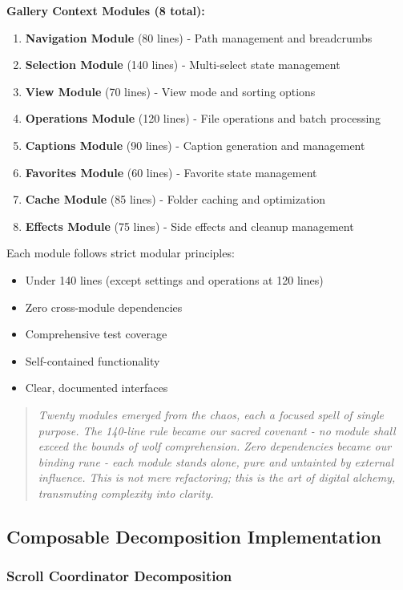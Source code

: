 \documentclass[11pt]{article}
\begin{document}
\textbf{Gallery Context Modules (8 total):}
\begin{enumerate}
\item \textbf{Navigation Module} (80 lines) - Path management and breadcrumbs
\item \textbf{Selection Module} (140 lines) - Multi-select state management
\item \textbf{View Module} (70 lines) - View mode and sorting options
\item \textbf{Operations Module} (120 lines) - File operations and batch processing
\item \textbf{Captions Module} (90 lines) - Caption generation and management
\item \textbf{Favorites Module} (60 lines) - Favorite state management
\item \textbf{Cache Module} (85 lines) - Folder caching and optimization
\item \textbf{Effects Module} (75 lines) - Side effects and cleanup management
\end{enumerate}

Each module follows strict modular principles:
\begin{itemize}
\item Under 140 lines (except settings and operations at 120 lines)
\item Zero cross-module dependencies
\item Comprehensive test coverage
\item Self-contained functionality
\item Clear, documented interfaces
\end{itemize}

\begin{quote}
\emph{Twenty modules emerged from the chaos, each a focused spell of single purpose. The 140-line rule became our sacred covenant - no module shall exceed the bounds of wolf comprehension. Zero dependencies became our binding rune - each module stands alone, pure and untainted by external influence. This is not mere refactoring; this is the art of digital alchemy, transmuting complexity into clarity.}
\end{quote}

\subsection{Composable Decomposition Implementation}

\subsubsection{Scroll Coordinator Decomposition}
\end{document}
